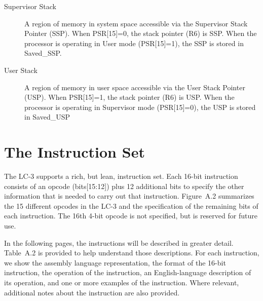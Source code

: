 \documentclass{patt}
\begin{document}
\begin{description}
\item[Supervisor Stack] A region of memory in system space accessible via the 
Supervisor Stack Pointer (SSP). When PSR[15]=0, the stack pointer (R6) is SSP.
When the processor is operating in User mode (PSR[15]=1), the SSP is stored in
Saved\_SSP.

\item[User Stack] A region of memory in user space accessible via
the User Stack Pointer (USP). When PSR[15]=1, the stack pointer (R6) is USP.
When the processor is operating in Supervisor mode (PSR[15]=0), the USP is
stored in Saved\_USP
\end{description}

\section{The Instruction Set}
\label{appLC2:insts}

The LC-3 supports a rich, but lean, instruction set. Each 16-bit
instruction consists of an opcode (bits[15:12]) plus 12 additional bits
to specify the other information that is needed to carry out that
instruction. Figure~A.2 summarizes the 15 different opcodes in
the LC-3 and the specification of the remaining bits of each instruction.
The 16th 4-bit opcode is not specified, but is reserved for future use.

In the following pages,
the instructions will be described in greater detail. Table~A.2 is
provided to help understand those descriptions.  For each
instruction, we show the assembly language representation, the
format of the 16-bit instruction, the operation of the instruction, an
English-language description of its operation, and one or more examples of
the instruction. Where relevant, additional notes about the instruction are
also provided.
\end{document}

